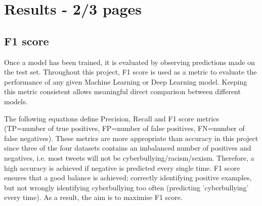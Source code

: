 \documentclass[12pt,a4paper]{article}
\begin{document}
\section{Results - 2/3 pages}

\subsection{F1 score}
Once a model has been trained, it is evaluated by observing predictions made on the test set. Throughout this project, F1 score is used as a metric to evaluate the performance of any given Machine Learning or Deep Learning model. Keeping this metric consistent allows meaningful direct comparison between different models.

The following equations define Precision, Recall and F1 score metrics (TP=number of true positives, FP=number of false positives, FN=number of false negatives). These metrics are more appropriate than accuracy in this project since three of the four datasets contains an imbalanced number of positives and negatives, i.e. most tweets will not be cyberbullying/racism/sexism. Therefore, a high accuracy is achieved if negative is predicted every single time. F1 score ensures that a good balance is achieved; correctly identifying positive examples, but not wrongly identifying cyberbullying too often (predicting 'cyberbullying' every time). As a result, the aim is to maximise F1 score.
\end{document}
